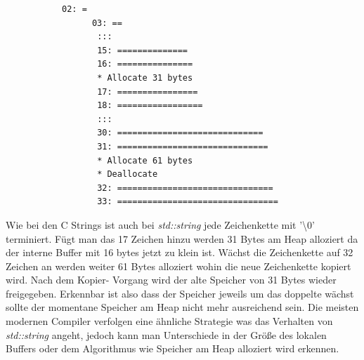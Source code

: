\documentclass[MES,Master,ngerman]{twbook}%
\begin{document}
\begin{figure}[!htb]
	\begin{subfigure}[b]{0.5\textwidth}
		
		\label{lst:10}
	\end{subfigure}
	\begin{subfigure}[b]{0.5\textwidth}
	\begin{lstlisting}[gobble=6, title={Ausgabe Quellcode (20)}, language=bash, numbers=none]
	   02: =                                                                           
 	  03: ==                                                                          
	   :::                                                               
	   15: ==============                                                              
	   16: ===============                                                             
	   * Allocate 31 bytes                                                             
	   17: ================                                                            
	   18: =================                                                           
	   :::                                            
	   30: =============================                                               
	   31: ==============================                                              
	   * Allocate 61 bytes                                                             
	   * Deallocate                                                                    
	   32: ===============================                                               
	   33: ================================                                             	
	\end{lstlisting}
	\end{subfigure}
\end{figure}

Wie bei den C Strings ist auch bei \textit{std::string} jede Zeichenkette mit '\textbackslash 0' terminiert. Fügt man das 17 Zeichen hinzu werden 31 Bytes am Heap alloziert da der interne Buffer mit 16 bytes jetzt zu klein ist. Wächst die Zeichenkette auf 32 Zeichen an werden weiter 61 Bytes alloziert wohin die neue Zeichenkette kopiert wird. Nach dem Kopier- Vorgang wird der alte Speicher von 31 Bytes wieder freigegeben. Erkennbar ist also dass der Speicher jeweils um das doppelte wächst sollte der momentane Speicher am Heap nicht mehr ausreichend sein. Die meisten modernen Compiler verfolgen eine ähnliche Strategie was das Verhalten von \textit{std::string} angeht, jedoch kann man Unterschiede in der Größe des lokalen Buffers oder dem Algorithmus wie Speicher am Heap alloziert wird erkennen. \newpage
\end{document}
